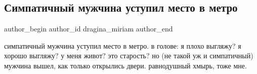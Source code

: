  
 
 
 
 
 
\subsection{Симпатичный мужчина уступил место в метро}
\label{sec:27_10_2021.fb.dragina_miriam.1.muzhschina_metro}
 
\ifcmt
 author_begin
   author_id dragina_miriam
 author_end
\fi

симпатичный мужчина уступил место в метро. в голове: я плохо выгляжу? я хорошо
выгляжу? у меня живот? это старость?  но (не такой уж и симпатичный) мужчина
вышел, как только открылись двери. равнодушный хмырь, тоже мне.

